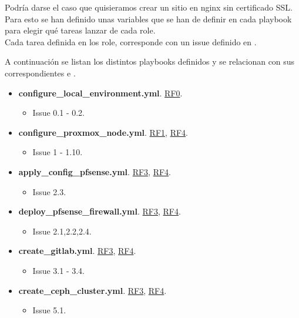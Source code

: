 \begin{text}
\begin{text}
	Podría darse el caso que quisieramos crear un sitio en nginx sin certificado SSL. Para esto se han definido unas variables que se han de definir en cada playbook para elegir qué tareas lanzar de cada role. \\
	Cada tarea definida en los role, corresponde con un issue definido en .
	
	\clearpage
	
	A continuación se listan los distintos playbooks definidos y se relacionan con sus correspondientes  e .
	
	\begin{itemize}
		\item \textbf{configure\_local\_environment.yml}. \hyperref[RF0]{RF0}.
		\begin{itemize}
			\item Issue 0.1 - 0.2.
		\end{itemize}
	
		\item \textbf{configure\_proxmox\_node.yml}. \hyperref[RF1]{RF1}, \hyperref[RF4]{RF4}.
		\begin{itemize}
			\item Issue 1 - 1.10.
		\end{itemize}
	
		\item \textbf{apply\_config\_pfsense.yml}. \hyperref[RF3]{RF3}, \hyperref[RF4]{RF4}.
		\begin{itemize}
			\item Issue 2.3.
		\end{itemize}
	
		\item \textbf{deploy\_pfsense\_firewall.yml}. \hyperref[RF3]{RF3}, \hyperref[RF4]{RF4}.
		\begin{itemize}
			\item Issue 2.1,2.2,2.4.
		\end{itemize}
		
		\item \textbf{create\_gitlab.yml}. \hyperref[RF3]{RF3}, \hyperref[RF4]{RF4}.
		\begin{itemize}
			\item Issue 3.1 - 3.4.
		\end{itemize}
	
		\item \textbf{create\_ceph\_cluster.yml}. \hyperref[RF3]{RF3}, \hyperref[RF4]{RF4}.
		\begin{itemize}
			\item Issue 5.1.
		\end{itemize}
	

\end{itemize}
\end{text}
\end{text}
